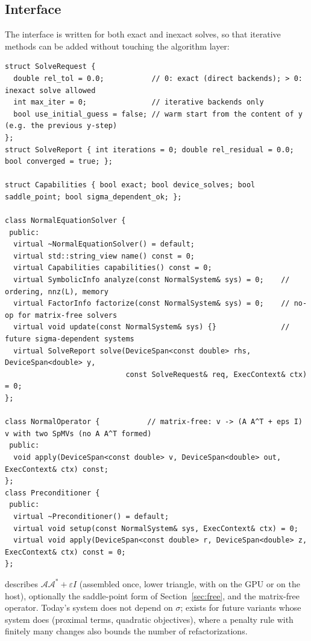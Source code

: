 \documentclass[11pt]{article}
\newcommand{\A}{\mathcal{A}}
\newcommand{\Ad}{\mathcal{A}^{*}}
\begin{document}
\subsection{Interface}
The interface is written for both exact and inexact solves, so that iterative methods can be added without
touching the algorithm layer:
\begin{lstlisting}
struct SolveRequest {
  double rel_tol = 0.0;           // 0: exact (direct backends); > 0: inexact solve allowed
  int max_iter = 0;               // iterative backends only
  bool use_initial_guess = false; // warm start from the content of y (e.g. the previous y-step)
};
struct SolveReport { int iterations = 0; double rel_residual = 0.0; bool converged = true; };

struct Capabilities { bool exact; bool device_solves; bool saddle_point; bool sigma_dependent_ok; };

class NormalEquationSolver {
 public:
  virtual ~NormalEquationSolver() = default;
  virtual std::string_view name() const = 0;
  virtual Capabilities capabilities() const = 0;
  virtual SymbolicInfo analyze(const NormalSystem& sys) = 0;    // ordering, nnz(L), memory
  virtual FactorInfo factorize(const NormalSystem& sys) = 0;    // no-op for matrix-free solvers
  virtual void update(const NormalSystem& sys) {}               // future sigma-dependent systems
  virtual SolveReport solve(DeviceSpan<const double> rhs, DeviceSpan<double> y,
                            const SolveRequest& req, ExecContext& ctx) = 0;
};

class NormalOperator {           // matrix-free: v -> (A A^T + eps I) v with two SpMVs (no A A^T formed)
 public:
  void apply(DeviceSpan<const double> v, DeviceSpan<double> out, ExecContext& ctx) const;
};
class Preconditioner {
 public:
  virtual ~Preconditioner() = default;
  virtual void setup(const NormalSystem& sys, ExecContext& ctx) = 0;
  virtual void apply(DeviceSpan<const double> r, DeviceSpan<double> z, ExecContext& ctx) const = 0;
};
\end{lstlisting}
 describes $\A\Ad+\varepsilon I$ (assembled once, lower triangle, with 
on the GPU or  on the host), optionally the saddle-point form of
Section~\ref{sec:free}, and the matrix-free operator. Today's system does not depend on $\sigma$;
 exists for future variants whose system does (proximal terms, quadratic objectives), where a
penalty rule with finitely many changes also bounds the number of refactorizations.
\end{document}
